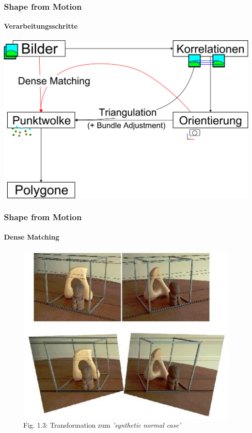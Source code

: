 \documentclass{beamer}
\begin{document}
\begin{frame}
	\frametitle{Shape from Motion}
	\framesubtitle{Verarbeitungsschritte}

	\includegraphics[width=\linewidth]{includes/shape-from-motion_process_3}
\end{frame}


\begin{frame}
	\frametitle{Shape from Motion}
	\framesubtitle{Dense Matching}

	\begin{figure}
		\includegraphics[width=0.8\linewidth]{includes/dense-matching}\\
		{\scriptsize Fig. 1.3: Transformation zum \textit{'synthetic normal case'}}
	\end{figure}
\end{frame}

\end{document}
